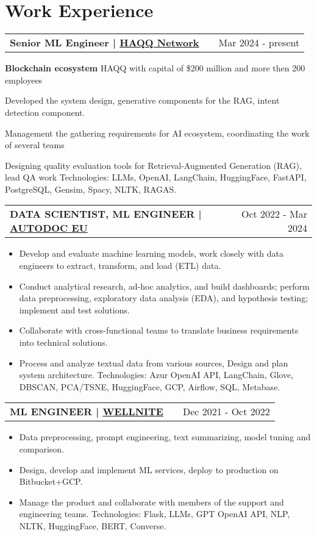 \documentclass[a4paper,12pt]{article}
\makeatletter
\newenvironment{jobshort}[2]
    {
    \begin{tabularx}{\linewidth}{@{}l X r@{}}
    \textbf{#1} & \hfill &  #2 \\[3.75pt]
    \end{tabularx}
    }
    {
    }
\newenvironment{joblong}[2]
    {
    \begin{tabularx}{\linewidth}{@{}l X r@{}}
    \textbf{#1} & \hfill &  #2 \\[3.75pt]
    \end{tabularx}
    \begin{minipage}[t]{\linewidth}
    \begin{itemize}[nosep,after=\strut, leftmargin=1em, itemsep=3pt,label=--]
    }
    {
    \end{itemize}
    \end{minipage}    
    }
\makeatother
\begin{document}
\section{Work Experience}

\begin{jobshort}{Senior ML Engineer | \href{https://haqq.network/}{HAQQ Network}}{Mar 2024 - present}
\footnotesize \textbf{Blockchain ecosystem} HAQQ with capital of \$200 million and more then 200 employees \\
\item Developed the system design, generative components for the RAG, intent detection component.
\item Management the gathering requirements for AI ecosystem, coordinating the work of several teams
\item Designing quality evaluation tools for Retrieval-Augmented Generation (RAG), lead QA work
\footnotesize Technologies: LLMs, OpenAI, LangChain, HuggingFace, FastAPI, PostgreSQL, Gensim, Spacy, NLTK, RAGAS. \\
\end{jobshort}


\begin{joblong}{DATA SCIENTIST, ML ENGINEER | \href{https://www.autodoc.eu/}{AUTODOC EU}}{Oct 2022 - Mar 2024}
\footnotesize EU top \textbf{car-parts e-store} with €1.1B in sales and 5.2M products. Operating in 27 EU countries, 5000+ employees at 8 sites\\
\item Develop and evaluate machine learning models, work closely with data engineers to extract, transform, and load (ETL) data.
\item Conduct analytical research, ad-hoc analytics, and build dashboards; perform data preprocessing, exploratory data analysis (EDA), and hypothesis testing; implement and test solutions.
\item Collaborate with cross-functional teams to translate business requirements into technical solutions.
\item Process and analyze textual data from various sources, Design and plan system architecture.
\footnotesize Technologies: Azur OpenAI API, LangChain, Glove, DBSCAN, PCA/TSNE, HuggingFace, GCP, Airflow, SQL, Metabase.\\
\end{joblong}


\begin{joblong}{ML ENGINEER | \href{wellnite.com}{WELLNITE}}{Dec 2021 - Oct 2022}
\footnotesize  Well-being \textbf{self-care} and \textbf{medtech} startup hit \$17.6M revenue in 2023 with a 67 person team.\\
\item Data preprocessing, prompt engineering, text summarizing, model tuning and comparison.
\item Design, develop and implement ML services, deploy to production on Bitbucket+GCP.
\item Manage the product and collaborate with members of the support and engineering teams.
\footnotesize Technologies: Flask, LLMs, GPT OpenAI API, NLP, NLTK, HuggingFace, BERT, Converse. \\
\end{joblong}
\end{document}
